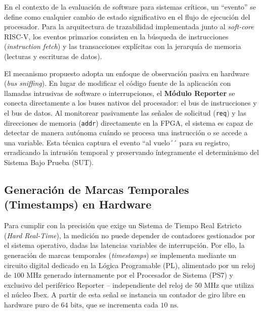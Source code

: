 En el contexto de la evaluación de software para sistemas críticos, un ``evento'' se define como cualquier cambio de estado significativo en el flujo de ejecución del procesador. Para la arquitectura de trazabilidad implementada junto al \textit{soft-core} RISC-V, los eventos primarios consisten en la búsqueda de instrucciones (\textit{instruction fetch}) y las transacciones explícitas con la jerarquía de memoria (lecturas y escrituras de datos).

El mecanismo propuesto adopta un enfoque de observación pasiva en hardware (\textit{bus sniffing}). En lugar de modificar el código fuente de la aplicación con llamadas intrusivas de software o interrupciones, el \textbf{Módulo Reporter} se conecta directamente a los buses nativos del procesador: el bus de instrucciones y el bus de datos. Al monitorear pasivamente las señales de solicitud (\texttt{req}) y las direcciones de memoria (\texttt{addr}) directamente en la FPGA, el sistema es capaz de detectar de manera autónoma cuándo se procesa una instrucción o se accede a una variable. Esta técnica captura el evento ``al vuelo´´   para su registro, erradicando la intrusión temporal y preservando íntegramente el determinismo del Sistema Bajo Prueba (SUT).

\subsection{Generación de Marcas Temporales (Timestamps) en Hardware}
\label{ssec:generacion_timestamps}

Para cumplir con la precisión que exige un Sistema de Tiempo Real
     Estricto (\textit{Hard Real-Time}), la medición no puede depender de
     contadores gestionados por el sistema operativo, dadas las latencias
     variables de interrupción. Por ello, la generación de marcas
     temporales (\textit{timestamps}) se implementa mediante un circuito
     digital dedicado en la Lógica Programable (PL), alimentado por un
     reloj de $100\text{ MHz}$ generado internamente por el Procesador de
     Sistema (PS7) y exclusivo del periférico Reporter -- independiente
     del reloj de $50\text{ MHz}$ que utiliza el núcleo Ibex. A partir de
     esta señal se instancia un contador de giro libre en hardware puro de
     $64\text{ bits}$, que se incrementa cada $10\text{ ns}$.


